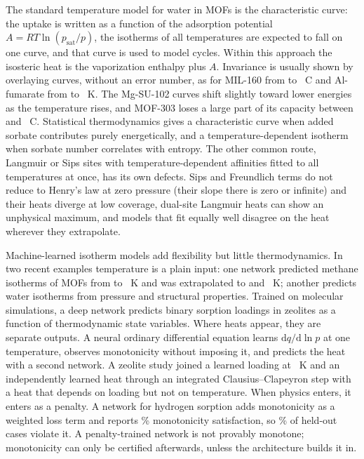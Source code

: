 \documentclass[journal=jcisd8,manuscript=article]{achemso}
\begin{document}
The standard temperature model for water in MOFs is the characteristic curve: the uptake is written as a function
of the adsorption potential $A = RT\ln(p_{\mathrm{sat}}/p)$, the isotherms of all temperatures are expected to fall
on one curve, and that curve is used to model cycles\cite{liu2020}. Within this approach the isosteric heat is the
vaporization enthalpy plus $A$\cite{lenzen2019}. Invariance is usually shown by overlaying curves, without an error
number, as for MIL-160 from  to ~\textdegree C\cite{solovyeva2021} and Al-fumarate
from  to ~K\cite{trezza2022}. The Mg-SU-102 curves shift slightly toward lower
energies as the temperature rises\cite{oppenheim2025}, and MOF-303 loses a large part of its capacity between
 and ~\textdegree C\cite{hastings2024}. Statistical thermodynamics gives a
characteristic curve when added sorbate contributes purely energetically, and a temperature-dependent isotherm
when sorbate number correlates with entropy\cite{shimizu2021}. The other common route, Langmuir or Sips sites with
temperature-dependent affinities fitted to all temperatures at once\cite{lenzen2019,siperstein2021}, has its own
defects. Sips and Freundlich terms do not reduce to Henry's law at zero pressure (their slope there is zero or
infinite) and their heats diverge at low coverage,
dual-site Langmuir heats can show an unphysical maximum, and models that fit equally well disagree on the heat
wherever they extrapolate\cite{siperstein2021}.

Machine-learned isotherm models add flexibility but little thermodynamics. In two recent examples temperature is a
plain input: one network predicted methane isotherms of  MOFs from  to
~K and was extrapolated to  and ~K\cite{dong2025}; another predicts
water isotherms from pressure and structural properties\cite{liu2023}. Trained on molecular simulations, a deep network predicts binary sorption loadings in zeolites as a function of thermodynamic state variables\cite{sun2019}. Where heats appear, they are separate
outputs. A neural ordinary differential equation learns $\mathrm{d}q/\mathrm{d}\ln p$ at one temperature, observes
monotonicity without imposing it, and predicts the heat with a second network\cite{lin2025}. A zeolite study joined
a learned loading at ~K and an independently learned heat through an integrated Clausius--Clapeyron
step with a heat that depends on loading but not on temperature\cite{daou2024}. When physics enters, it enters as a penalty. A network
for hydrogen sorption adds monotonicity as a weighted loss term and reports \% monotonicity
satisfaction, so \% of held-out cases violate it\cite{nooraiepour2026}. A penalty-trained network
is not provably monotone; monotonicity can only be certified afterwards\cite{liu2020cert}, unless the architecture builds it in\cite{wehenkel2019}.
\end{document}
